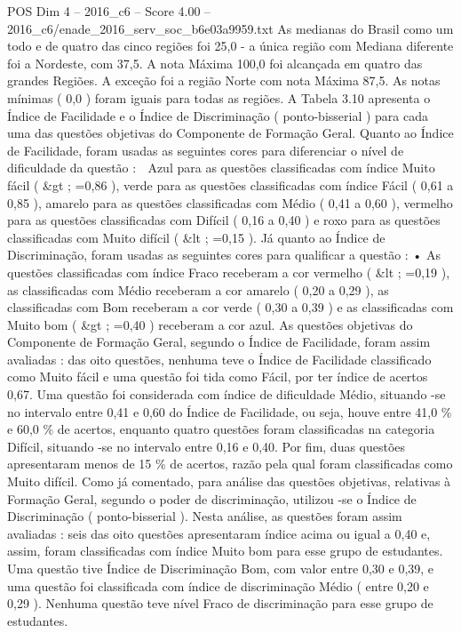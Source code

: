\begin{textsample}{POS Dim 4 – 2016\_c6 – Score 4.00 – 2016\_c6/enade\_2016\_serv\_soc\_b6e03a9959.txt}
As medianas do Brasil como um todo e de quatro das cinco regiões foi 25,0 - a única região com Mediana diferente foi a Nordeste, com 37,5.
A nota Máxima 100,0 foi alcançada em quatro das grandes Regiões.
A exceção foi a região Norte com nota Máxima 87,5.
As notas mínimas ( 0,0 ) foram iguais para todas as regiões.
A Tabela 3.10 apresenta o Índice de Facilidade e o Índice de Discriminação ( ponto-bisserial ) para cada uma das questões objetivas do Componente de Formação Geral.
Quanto ao Índice de Facilidade, foram usadas as seguintes cores para diferenciar o nível de dificuldade da questão :  Azul para as questões classificadas com índice Muito fácil ( \&gt ; =0,86 ), verde para as questões classificadas com índice Fácil ( 0,61 a 0,85 ), amarelo para as questões classificadas com Médio ( 0,41 a 0,60 ), vermelho para as questões classificadas com Difícil ( 0,16 a 0,40 ) e roxo para as questões classificadas com Muito difícil ( \&lt ; =0,15 ).
Já quanto ao Índice de Discriminação, foram usadas as seguintes cores para qualificar a questão : • As questões classificadas com índice Fraco receberam a cor vermelho ( \&lt ; =0,19 ), as classificadas com Médio receberam a cor amarelo ( 0,20 a 0,29 ), as classificadas com Bom receberam a cor verde ( 0,30 a 0,39 ) e as classificadas com Muito bom ( \&gt ; =0,40 ) receberam a cor azul.
As questões objetivas do Componente de Formação Geral, segundo o Índice de Facilidade, foram assim avaliadas : das oito questões, nenhuma teve o Índice de Facilidade classificado como Muito fácil e uma questão foi tida como Fácil, por ter índice de acertos 0,67.
Uma questão foi considerada com índice de dificuldade Médio, situando -se no intervalo entre 0,41 e 0,60 do Índice de Facilidade, ou seja, houve entre 41,0 \% e 60,0 \% de acertos, enquanto quatro questões foram classificadas na categoria Difícil, situando -se no intervalo entre 0,16 e 0,40.
Por fim, duas questões apresentaram menos de 15 \% de acertos, razão pela qual foram classificadas como Muito difícil.
Como já comentado, para análise das questões objetivas, relativas à Formação Geral, segundo o poder de discriminação, utilizou -se o Índice de Discriminação ( ponto-bisserial ).
Nesta análise, as questões foram assim avaliadas : seis das oito questões apresentaram índice acima ou igual a 0,40 e, assim, foram classificadas com índice Muito bom para esse grupo de estudantes.
Uma questão tive Índice de Discriminação Bom, com valor entre 0,30 e 0,39, e uma questão foi classificada com índice de discriminação Médio ( entre 0,20 e 0,29 ).
Nenhuma questão teve nível Fraco de discriminação para esse grupo de estudantes.

\end{textsample}
